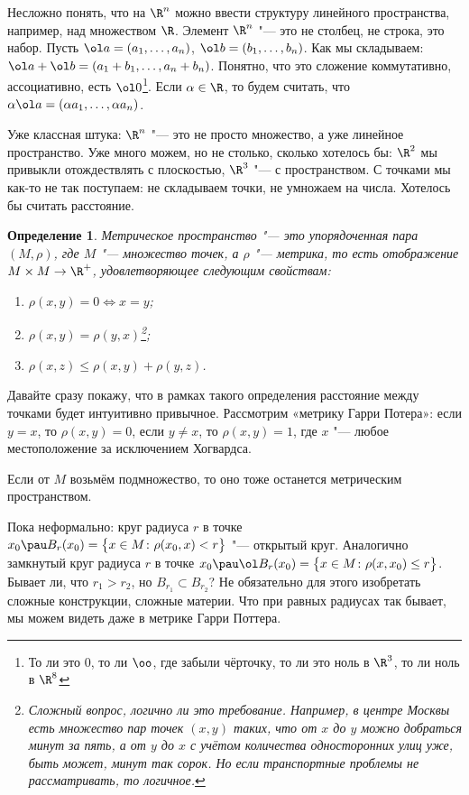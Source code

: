 \documentclass[a4paper,10pt,twoside]{article}
\newtheorem{Def}{Определение}[section]
\begin{document}
	Несложно понять, что на $\R^n$ можно ввести структуру линейного пространства, например, над множеством $\R$. Элемент $\R^n$ "--- это не столбец, не строка, это набор.
	Пусть $\ol a=(a_1,\ldots,a_n)$, $\ol b=(b_1,\ldots, b_n)$. Как мы складываем: $\ol a+\ol b=(a_1+b_1,\ldots,a_n+b_n)$. Понятно, что это сложение
	коммутативно, ассоциативно, есть $\ol 0$\footnote{То ли это 
	$0$, то ли $\oo$, где забыли чёрточку, то ли это ноль в $\R^3$, то ли ноль в $\R^8$}. Если $\alpha\in\R$, то будем считать, что $\alpha\ol a=(\alpha a_1,\ldots,\alpha a_n)$.
	
	Уже классная штука: $\R^n$ "--- это не просто множество, а уже линейное пространство. Уже много можем, но не столько, сколько хотелось бы:
	$\R^2$ мы привыкли отождествлять с плоскостью, $\R^3$ "--- с пространством. С точками мы как-то не так поступаем: не складываем точки, не умножаем на числа.
	Хотелось бы считать расстояние.
	\begin{Def}
	Метрическое пространство "--- это упорядоченная пара $(M,\rho)$, где $M$ "--- множество точек, а $\rho$ "--- метрика, то есть отображение
	$M\times M\to \R^+$, удовлетворяющее следующим свойствам:
	\begin{enumerate}
	  \item $\rho(x,y)=0\iff x= y$;
	  \item $\rho(x,y)=\rho(y,x)$\footnote{Сложный вопрос, логично ли это требование. Например, в центре Москвы есть множество пар точек $(x,y)$ таких,
	  что от $x$ до $y$ можно добраться минут за пять, а от $y$ до $x$ с учётом количества односторонних улиц уже, быть может, минут так сорок. Но 
	  если транспортные проблемы не рассматривать, то логичное.};
	  \item $\rho(x,z)\leq\rho(x,y)+\rho(y,z)$.
	\end{enumerate}
	\end{Def}
	Давайте сразу покажу, что в рамках такого определения расстояние между точками будет интуитивно привычное. Рассмотрим «метрику Гарри Потера»:
	если $y=x$, то $\rho(x,y)=0$, если $y\neq x$, то $\rho(x,y)=1$, где $x$ "--- любое местоположение за исключением Хогвардса.
	
	Если от $M$ возьмём подмножество, то оно тоже останется метрическим пространством.
	
	Пока неформально: круг радиуса $r$ в точке $x_0\pau B_r(x_0)=\big\{x\in M\colon \rho(x_0,x)<r\big\}$ "--- открытый круг. Аналогично замкнутый
	круг радиуса $r$  в точке $x_0\pau \ol B_r(x_0)=\big\{x\in M\colon \rho(x,x_0)\leq r\big\}$.
	Бывает ли, что $r_1>r_2$, но $B_{r_1}\subset B_{r_2}$? Не обязательно для этого изобретать сложные конструкции,
	сложные материи. Что при равных радиусах так бывает, мы можем видеть даже в метрике Гарри Поттера.
	
\end{document}
